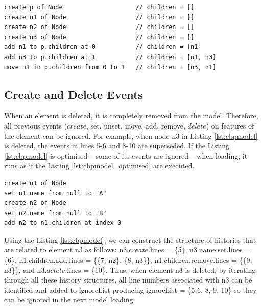 {\vspace{-20pt}
\begin{lstlisting}[style=eol,caption={A naive optimised CBP representation of original CBP representation in Listing \ref{lst:add_remove_move_reference} .},label=lst:naive_add_remove_move_reference]
create p of Node                    // children = []
create n1 of Node                   // children = []
create n2 of Node                   // children = []
create n3 of Node                   // children = []
add n1 to p.children at 0           // children = [n1]
add n3 to p.children at 1           // children = [n1, n3]
move n1 in p.children from 0 to 1   // children = [n3, n1]
\end{lstlisting}

\subsection{Create and Delete Events}
\label{subsec:create_and_delete_operations}

When an element is deleted, it is completely removed from the model. Therefore, all previous events ($create$, \textsf{set}, \textsf{unset}, \textsf{move}, \textsf{add}, \textsf{remove}, $delete$) on features of the element can be ignored. For example, when node \textsf{n3} in Listing \ref{lst:cbpmodel} is deleted, the events in lines 5-6 and 8-10 are superseded. If the Listing \ref{lst:cbpmodel} is optimised -- some of its events are ignored -- when loading, it runs as if the Listing \ref{lst:cbpmodel_optimised} are executed.

\vspace{-20pt}
\begin{lstlisting}[style=eol,caption={Change-based representation of the model in Figure \ref{fig:tree_example} after removal of node \textsf{n3}.},label=lst:cbpmodel_optimised]
create n1 of Node
set n1.name from null to "A"
create n2 of Node
set n2.name from null to "B"
add n2 to n1.children at index 0
\end{lstlisting}

Using the Listing \ref{lst:cbpmodel}, we can construct the structure of histories that are related to element \textsf{n3} as follows: \textsf{n3}.$create$.\textsf{lines} = \{5\}, \textsf{n3}.\textsf{name}.\textsf{set}.\textsf{lines} = \{6\}, \textsf{n1}.\textsf{children}.\textsf{add}.\textsf{lines} = \{\{7, \textsf{n2}\}, \{8, \textsf{n3}\}\}, \textsf{n1}.\textsf{children}.\textsf{remove}.\textsf{lines} = \{\{9, \textsf{n3}\}\}, and \textsf{n3}.$delete$.\textsf{lines} = \{10\}. Thus, when element \textsf{n3} is deleted, by iterating through all these history structures, all line numbers associated with \textsf{n3} can be identified and added to \textsf{ignoreList} producing \textsf{ignoreList} = \{5 6, 8, 9, 10\} so they can be ignored in the next model loading.

}
